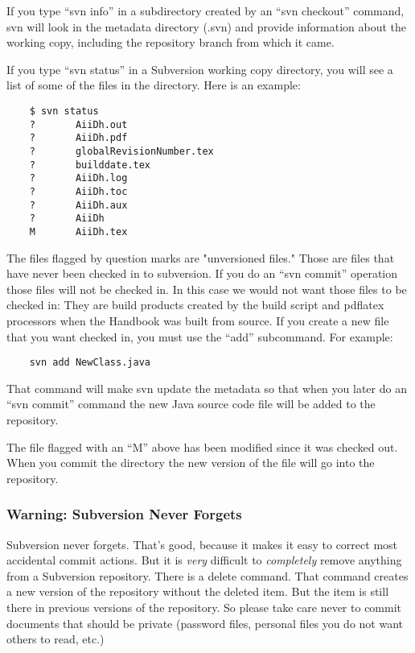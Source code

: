 If you type ``svn info'' in a subdirectory created by an 
``svn checkout'' command, svn will look in the metadata directory 
(.svn) and provide information about the working copy,
including the repository branch from which it came.

If you type ``svn status'' in a Subversion working copy
directory, you will see a list of some of the files in the
directory.  Here is an example:
\begin{verbatim}
    $ svn status
    ?       AiiDh.out
    ?       AiiDh.pdf
    ?       globalRevisionNumber.tex
    ?       builddate.tex
    ?       AiiDh.log
    ?       AiiDh.toc
    ?       AiiDh.aux
    ?       AiiDh
    M       AiiDh.tex
\end{verbatim}

The files flagged by question marks are "unversioned files."  Those
are files that have never been checked in to subversion.  If you do
an ``svn commit'' operation those files will not be checked in.  In
this case we would not want those files to be checked in: They are
build products created by the build script and pdflatex processors
when the Handbook was built from source.  If you create a new file
that you want checked in, you must use the ``add'' subcommand.  For 
example:
\begin{verbatim}
    svn add NewClass.java
\end{verbatim}
That command will make svn update the metadata so that when you
later do an ``svn commit'' command the new Java source code file
will be added to the repository.

The file flagged with an ``M'' above has been modified since it
was checked out.  When you commit the directory the new version of
the file will go into the repository.


\subsubsection{Warning: Subversion Never Forgets}

Subversion never forgets.  That's good, because it makes it easy
to correct most accidental commit actions.  But it is {\em very} difficult
to {\em completely} remove anything from a Subversion repository.
There is a delete command.  That command creates a new version of the
repository without the deleted item.  But the item is still there in
previous versions of the repository.  So please take care
never to commit documents that should be private (password
files, personal files you do not want others to read, etc.)


